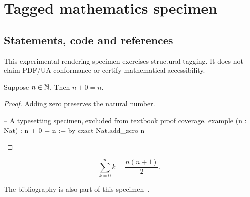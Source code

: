\documentclass[11pt,oneside]{book}
\begin{document}
\chapter{Tagged mathematics specimen}
\section{Statements, code and references}

This experimental rendering specimen exercises structural tagging. It does not
claim PDF/UA conformance or certify mathematical accessibility.

\begin{theorem}
  Suppose $n \in \mathbb{N}$. Then $n+0=n$.
\end{theorem}
\begin{proof}
  Adding zero preserves the natural number.
  \begin{lean}
    -- A typesetting specimen, excluded from textbook proof coverage.
    example (n : Nat) : n + 0 = n := by
      exact Nat.add_zero n
  \end{lean}
\end{proof}

\[
  \sum_{k=0}^{n} k = \frac{n(n+1)}{2}.
\]

The bibliography is also part of this specimen~\cite{specimen}.
\printbibliography
\end{document}
